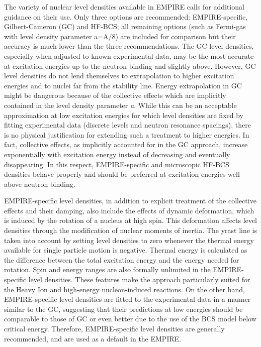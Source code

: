 The variety of nuclear level densities available in EMPIRE calls for
additional guidance on their use. Only three options are recommended:
EMPIRE-specific, Gilbert-Cameron (GC) and HF-BCS; all remaining options
(such as Fermi-gas with level density parameter a=A/8) are included for
comparison but their accuracy is much lower than the three recommendations.
The GC level densities, especially when adjusted to known experimental data,
may be the most accurate at excitation energies up to the neutron binding
and slightly above. However, GC level densities do not lend themselves to
extrapolation to higher excitation energies and to nuclei far from the
stability line. Energy extrapolation in GC might be dangerous because of the
collective effects which are implicitly contained in the level density
parameter \textit{a}. While this can be an acceptable approximation at low
excitation energies for which level densities are fixed by fitting
experimental data (discrete levels and neutron resonance spacings), there is
no physical justification for extending such a treatment to higher energies.
In fact, collective effects, as implicitly accounted for in the GC approach,
increase exponentially with excitation energy instead of decreasing and
eventually disappearing. In this respect, EMPIRE-specific and microscopic
HF-BCS densities behave properly and should be preferred at excitation
energies well above neutron binding.

EMPIRE-specific level densities, in addition to explicit treatment of the
collective effects and their damping, also include the effects of dynamic
deformation, which is induced by the rotation of a nucleus at high spin.
This deformation affects level densities through the modification of nuclear
moments of inertia. The yrast line is taken into account by setting level
densities to zero whenever the thermal energy available for single particle
motion is negative. Thermal energy is calculated as the difference between
the total excitation energy and the energy needed for rotation. Spin and
energy ranges are also formally unlimited in the EMPIRE-specific level
densities. These features make the approach particularly suited for the
Heavy Ion and high-energy nucleon-induced reactions. On the other hand,
EMPIRE-specific level densities are fitted to the experimental data in a
manner similar to the GC, suggesting that their predictions at low energies
should be comparable to those of GC or even better due to the use of the BCS
model below critical energy. Therefore, EMPIRE-specific level densities are
generally recommended, and are used as a default in the EMPIRE.


